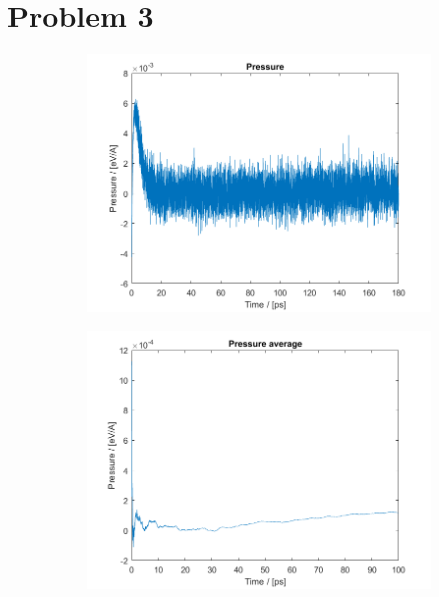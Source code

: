 \section*{Problem 3}

\begin{figure}[H]
    \centering
    \captionsetup[subfigure]{justification=centering}
    \begin{subfigure}[b]{0.40\textwidth}
        \centering
        \includegraphics[width=\textwidth]{graphics/task3/pressure.png}
    \end{subfigure}
    \begin{subfigure}[b]{0.40\textwidth}
        \centering
        \includegraphics[width=\textwidth]{graphics/task3/pressure_avg.png}

\end{subfigure}
\end{figure}
